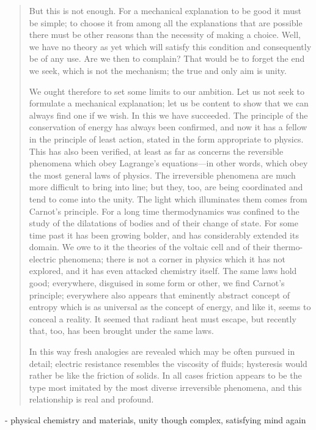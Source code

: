\begin{quote}
     But this is not enough.  For a mechanical explanation to be good it must be simple; to choose it from among all the explanations that are possible there must be other reasons than the necessity of making a choice.  Well, we have no theory as yet which will satisfy this condition and consequently be of any use.  Are we then to complain?  That would be to forget the end we seek, which is not the mechanism; the true and only aim is unity.  
     
     We ought therefore to set some limits to our ambition.  Let us not seek to formulate a mechanical explanation; let us be content to show that we can always find one if we wish.  In this we have succeeded.  The principle of the conservation of energy has always been confirmed, and now it has a fellow in the principle of least action, stated in the form appropriate to physics.  This has also been verified, at least as far as concerns the reversible phenomena which obey Lagrange's equations---in other words, which obey the most general laws of physics.  The irreversible phenomena are much more difficult to bring into line; but they, too, are being coordinated and tend to come into the unity.  The light which illuminates them comes from Carnot's principle.  For a long time thermodynamics was confined to the study of the dilatations of bodies and of their change of state.  For some time past it has been growing bolder, and has considerably extended its domain.  We owe to it the theories of the voltaic cell and of their thermo-electric phenomena; there is not a corner in physics which it has not explored, and it has even attacked chemistry itself.  The same laws hold good; everywhere, disguised in some form or other, we find Carnot's principle; everywhere also appears that eminently abstract concept of entropy which is as universal as the concept of energy, and like it, seems to conceal a reality.  It seemed that radiant heat must escape, but recently that, too, has been brought under the same laws.  
     
     In this way fresh analogies are revealed which may be often pursued in detail; electric resistance resembles the viscosity of fluids; hysteresis would rather be like the friction of solids.  In all cases friction appears to be the type most imitated by the most diverse irreversible phenomena, and this relationship is real and profound.  
     \citep[p. 175 - 178]{Poincare1952}
 \end{quote}
 
 - physical chemistry and materials, unity though complex, satisfying mind again
 
